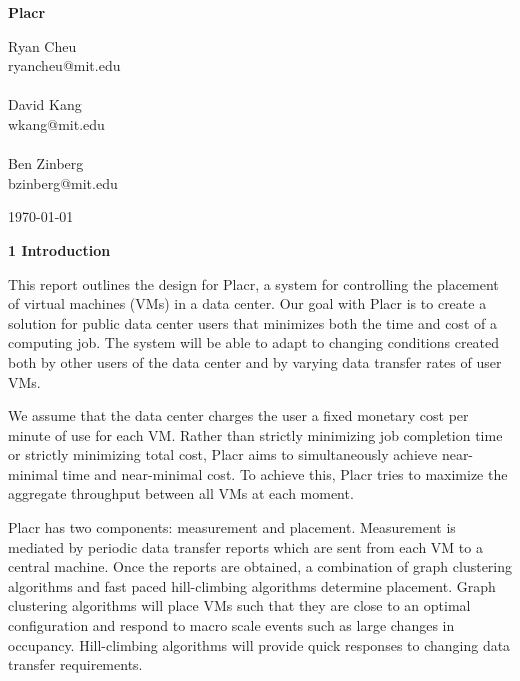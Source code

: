 \documentclass[11pt]{article}
\begin{document}
\begin{titlepage}



{ \huge \bfseries Placr\\[0.4cm] }
\begin{minipage}{0.4\textwidth}
Ryan Cheu \\ryancheu@mit.edu\\\\
David Kang \\wkang@mit.edu\\\\
Ben Zinberg \\bzinberg@mit.edu\\
\end{minipage}



\vfill

{\large \today}

\end{titlepage}
\newpage


\LARGE{\textbf{1 Introduction}}

\normalsize


This report outlines the design for Placr, a system for controlling the placement of virtual machines (VMs) in a data center.  Our goal with Placr is to create a solution for public data center users that minimizes both the time and cost of a computing job.  The system will be able to adapt to changing conditions created both by other users of the data center and by varying data transfer rates of user VMs.

We assume that the data center charges the user a fixed monetary cost per minute of use for each VM.  Rather than strictly minimizing job completion time or strictly minimizing total cost, Placr aims to simultaneously achieve near-minimal time and near-minimal cost.  To achieve this, Placr tries to maximize the aggregate throughput between all VMs at each moment.

	Placr has two components: measurement and placement.  Measurement is mediated by periodic data transfer reports which are sent from each VM to a central machine.  Once the reports are obtained, a combination of graph clustering algorithms and fast paced hill-climbing algorithms determine placement. Graph clustering algorithms will place VMs such that they are close to an optimal configuration and respond to macro scale events such as large changes in occupancy.  Hill-climbing algorithms will provide quick responses to changing data transfer requirements.
\end{document}
